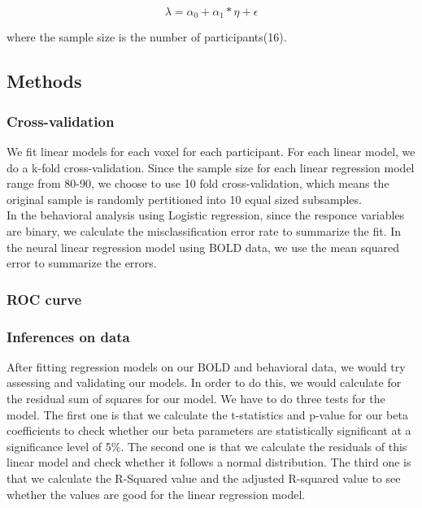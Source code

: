 \documentclass[11pt]{article}
\begin{document}
\begin{equation}
\lambda = \alpha_0 + \alpha_1 * \eta + \epsilon
\end{equation}

where the sample size is the number of participants(16).

\subsection{Methods}

\subsubsection{Cross-validation}

We fit linear models for each voxel for each participant. For each linear
model, we do a k-fold cross-validation. Since the sample size for each linear 
regression model range from 80-90, we choose to use 10 fold cross-validation,
which means the original sample is randomly pertitioned into 10 equal sized 
subsamples. \\
In the behavioral analysis using Logistic regression, since the responce 
variables are binary, we calculate the misclassification error rate to 
summarize the fit. In the neural linear regression model using BOLD data, we 
use the mean squared error to summarize the errors.

\subsubsection{ROC curve}

\subsubsection{Inferences on data}

After fitting regression models on our BOLD and behavioral data, we would try 
assessing and validating our models. In order to do this, we would calculate 
for the residual sum of squares for our model. We have to do three tests for 
the model. The first one is that we calculate the t-statistics and p-value for 
our beta coefficients to check whether our beta parameters are statistically 
significant at a significance level of 5\%. The second one is that we calculate
the residuals of this linear model and check whether it follows a normal 
distribution. The third one is that we calculate the R-Squared value and the 
adjusted R-squared value to see whether the values are good for the linear 
regression model.\\
\end{document}
